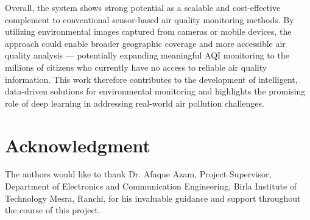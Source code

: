 \documentclass[conference]{IEEEtran}
\begin{document}
Overall, the system shows strong potential as a scalable and cost-effective
complement to conventional sensor-based air quality monitoring methods. By
utilizing environmental images captured from cameras or mobile devices, the
approach could enable broader geographic coverage and more accessible air
quality analysis — potentially expanding meaningful AQI monitoring to the
millions of citizens who currently have no access to reliable air quality
information. This work therefore contributes to the development of
intelligent, data-driven solutions for environmental monitoring and highlights
the promising role of deep learning in addressing real-world air pollution
challenges.

\section*{Acknowledgment}

The authors would like to thank Dr. Afaque Azam, Project Supervisor,
Department of Electronics and Communication Engineering, Birla Institute of
Technology Mesra, Ranchi, for his invaluable guidance and support throughout
the course of this project.
\end{document}
